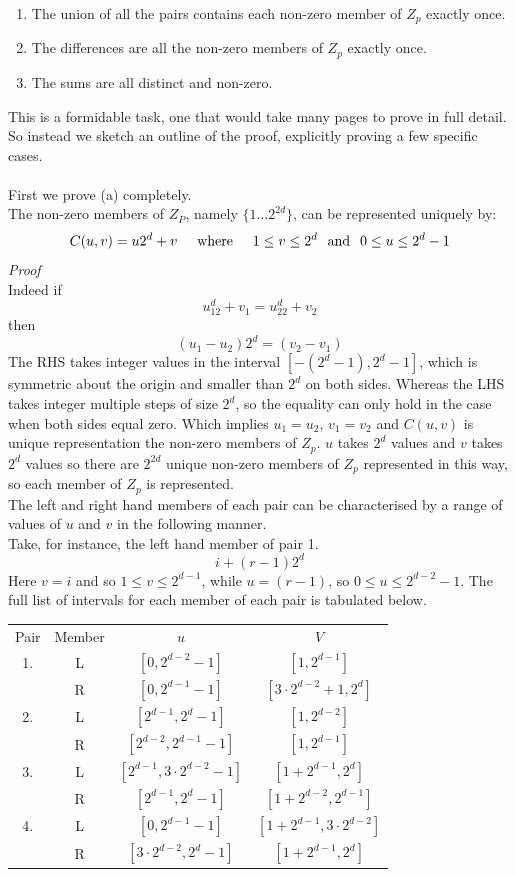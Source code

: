 \documentclass[
  12pt,
  a4paper]{book}
\begin{document}
\begin{enumerate}
\def\labelenumi{\arabic{enumi}.}
\item
  The union of all the pairs contains each non-zero member of \(Z_p\)
  exactly once.
\item
  The differences are all the non-zero members of \(Z_p\) exactly once.
\item
  The sums are all distinct and non-zero.
\end{enumerate}

This is a formidable task, one that would take many pages to prove in
full detail. So instead we sketch an outline of the proof, explicitly
proving a few specific cases.\\
~\\
First we prove (a) completely.\\
The non-zero members of \(Z_P\), namely \(\{1...2^{2d}\}\), can be
represented uniquely by:
\[C(u,v) = u2^d+v \hspace{0.5cm} \mathrm{where} \hspace{0.5cm} 1 \leq v \leq 2^d
\hspace{0.25cm} \mathrm{and} \hspace{0.25cm} 0 \leq u \leq 2^d-1\]
\emph{Proof}\\
Indeed if \[u_12^d+v_1=u_22^d+v_2\] then \[(u_1-u_2)2^d=(v_2-v_1)\] The
RHS takes integer values in the interval \([-(2^d-1),2^d-1]\), which is
symmetric about the origin and smaller than \(2^d\) on both sides. Whereas
the LHS takes integer multiple steps of size \(2^d\), so the equality can
only hold in the case when both sides equal zero. Which implies
\(u_1=u_2\), \(v_1=v_2\) and \(C(u,v)\) is unique representation the non-zero
members of \(Z_p\). \(u\) takes \(2^d\) values and \(v\) takes \(2^d\) values so
there are \(2^{2d}\) unique non-zero members of \(Z_p\) represented in this
way, so each member of \(Z_p\) is represented.\\
The left and right hand members of each pair can be characterised by a
range of values of \(u\) and \(v\) in the following manner.\\
Take, for instance, the left hand member of pair 1. \[i+(r-1)2^d\] Here
\(v=i\) and so \(1 \leq v \leq 2^{d-1}\), while \(u=(r-1)\), so
\(0 \leq u \leq 2^{d-2}-1\). The full list of intervals for each member of
each pair is tabulated below.

\begin{longtable}[]{@{}cccc@{}}
\toprule
\endhead
Pair & Member & \(u\) & \(V\)\tabularnewline
1. & L & \([0,2^{d-2}-1]\) & \([1,2^{d-1}]\)\tabularnewline
& R & \([0,2^{d-1}-1]\) & \([3 \cdot 2^{d-2}+1,2^{d}]\)\tabularnewline
2. & L & \([2^{d-1},2^{d}-1]\) & \([1,2^{d-2}]\)\tabularnewline
& R & \([2^{d-2},2^{d-1}-1]\) & \([1,2^{d-1}]\)\tabularnewline
3. & L & \([2^{d-1},3 \cdot 2^{d-2}-1]\) & \([1+2^{d-1},2^{d}]\)\tabularnewline
& R & \([2^{d-1},2^{d}-1]\) & \([1+ 2^{d-2},2^{d-1}]\)\tabularnewline
4. & L & \([0,2^{d-1}-1]\) & \([1+ 2^{d-1},3 \cdot 2^{d-2}]\)\tabularnewline
& R & \([3 \cdot 2^{d-2},2^{d}-1]\) & \([1+2^{d-1},2^{d}]\)\tabularnewline
\bottomrule
\end{longtable}
\end{document}
